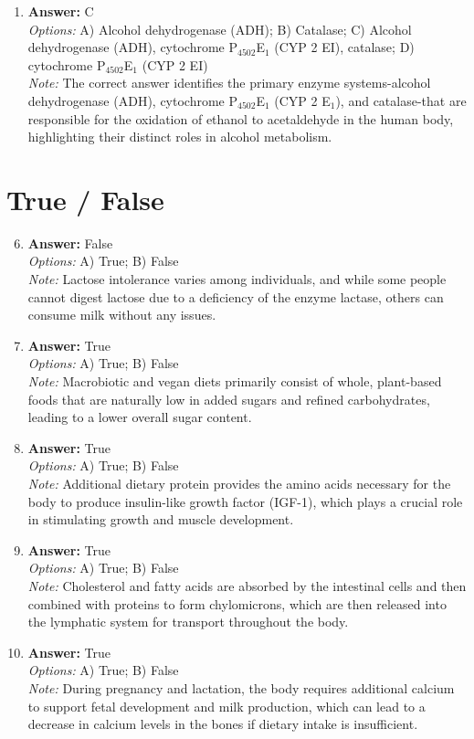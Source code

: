\documentclass[12pt]{article}
\begin{document}
\begin{enumerate}[label=\arabic*.]
\\ \textit{Note:} As individuals age, their metabolism typically slows down, often leading to a decrease in appetite rather than an increase.
\item \textbf{Answer:} C
\\ \textit{Options:} A) Alcohol dehydrogenase (ADH); B) Catalase; C) Alcohol dehydrogenase (ADH), cytochrome P$_{4502}$E$_{1}$ (CYP 2 EI), catalase; D) cytochrome P$_{4502}$E$_{1}$ (CYP 2 EI)
\\ \textit{Note:} The correct answer identifies the primary enzyme systems-alcohol dehydrogenase (ADH), cytochrome P$_{4502}$E$_{1}$ (CYP 2 E$_{1}$), and catalase-that are responsible for the oxidation of ethanol to acetaldehyde in the human body, highlighting their distinct roles in alcohol metabolism.
\end{enumerate}

\section*{True / False}
\begin{enumerate}[label=\arabic*.]
\setcounter{enumi}{5}
\item \textbf{Answer:} False
\\ \textit{Options:} A) True; B) False
\\ \textit{Note:} Lactose intolerance varies among individuals, and while some people cannot digest lactose due to a deficiency of the enzyme lactase, others can consume milk without any issues.
\item \textbf{Answer:} True
\\ \textit{Options:} A) True; B) False
\\ \textit{Note:} Macrobiotic and vegan diets primarily consist of whole, plant-based foods that are naturally low in added sugars and refined carbohydrates, leading to a lower overall sugar content.
\item \textbf{Answer:} True
\\ \textit{Options:} A) True; B) False
\\ \textit{Note:} Additional dietary protein provides the amino acids necessary for the body to produce insulin-like growth factor (IGF-1), which plays a crucial role in stimulating growth and muscle development.
\item \textbf{Answer:} True
\\ \textit{Options:} A) True; B) False
\\ \textit{Note:} Cholesterol and fatty acids are absorbed by the intestinal cells and then combined with proteins to form chylomicrons, which are then released into the lymphatic system for transport throughout the body.
\item \textbf{Answer:} True
\\ \textit{Options:} A) True; B) False
\\ \textit{Note:} During pregnancy and lactation, the body requires additional calcium to support fetal development and milk production, which can lead to a decrease in calcium levels in the bones if dietary intake is insufficient.
\end{enumerate}
\end{document}
